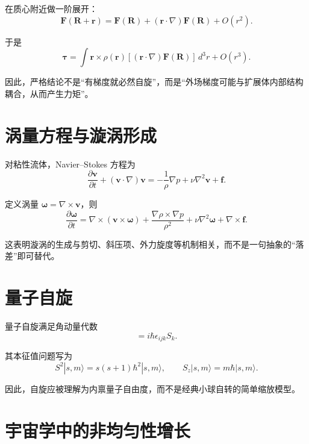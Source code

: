 \documentclass[12pt,a4paper]{ctexart}
\begin{document}
在质心附近做一阶展开：
\begin{equation}
\bm{F}(\bm{R}+\bm{r})=\bm{F}(\bm{R})+(\bm{r}\cdot\nabla)\bm{F}(\bm{R})+O(r^2).
\end{equation}

于是
\begin{equation}
\bm{\tau}=
\int \bm{r}\times \rho(\bm{r})[(\bm{r}\cdot\nabla)\bm{F}(\bm{R})]\,d^3r
+ O(r^3).
\end{equation}

因此，严格结论不是“有梯度就必然自旋”，而是“外场梯度可能与扩展体内部结构耦合，从而产生力矩”。

\section{涡量方程与漩涡形成}

对粘性流体，Navier--Stokes 方程为
\begin{equation}
\frac{\partial \bm{v}}{\partial t}
+(\bm{v}\cdot\nabla)\bm{v}
=
-\frac{1}{\rho}\nabla p+\nu\nabla^2\bm{v}+\bm{f}.
\end{equation}

定义涡量 $\bm{\omega}=\nabla\times\bm{v}$，则
\begin{equation}
\frac{\partial \bm{\omega}}{\partial t}
=
\nabla\times(\bm{v}\times\bm{\omega})
+\frac{\nabla\rho\times\nabla p}{\rho^2}
+\nu\nabla^2\bm{\omega}
+\nabla\times\bm{f}.
\end{equation}

这表明漩涡的生成与剪切、斜压项、外力旋度等机制相关，而不是一句抽象的“落差”即可替代。

\section{量子自旋}

量子自旋满足角动量代数
\begin{equation}
[S_i,S_j]=i\hbar\epsilon_{ijk}S_k.
\end{equation}

其本征值问题写为
\begin{equation}
S^2|s,m\rangle=s(s+1)\hbar^2|s,m\rangle,
\qquad
S_z|s,m\rangle=m\hbar|s,m\rangle.
\end{equation}

因此，自旋应被理解为内禀量子自由度，而不是经典小球自转的简单缩放模型。

\section{宇宙学中的非均匀性增长}
\end{document}
